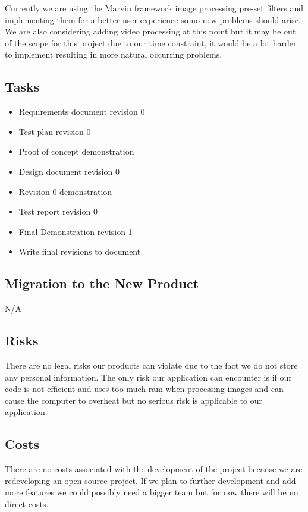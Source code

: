 \documentclass[12pt, titlepage]{article}
\begin{document}
Currently we are using the Marvin framework image processing pre-set filters and implementing them for a better user experience so no new problems should arise. We are also considering adding video processing at this point but it may be out of the scope for this project due to our time constraint, it would be a lot harder to implement resulting in more natural occurring problems.

\subsection{Tasks}

\begin{itemize}
\item Requirements document revision 0
\item Test plan revision 0
\item Proof of concept demonstration
\item Design document revision 0
\item Revision 0 demonstration
\item Test report revision 0
\item Final Demonstration revision 1  
\item Write final revisions to document
\end{itemize}

\subsection{Migration to the New Product}

N/A

\subsection{Risks}

There are no legal risks our products can violate due to the fact we do not store any personal information. The only risk our application can encounter is if our code is not efficient and uses too much ram when processing images and can cause the computer to overheat but no serious risk is applicable to our application.

\subsection{Costs}

There are no costs associated with the development of the project because we are redeveloping an open source project. If we plan to further development and add more features we could possibly need a bigger team but for now there will be no direct costs.
\end{document}
